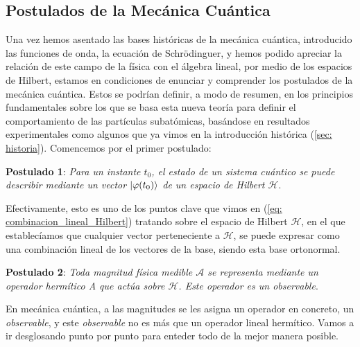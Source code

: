 \documentclass[12pt]{article}
\numberwithin{equation}{section} %
\begin{document}
    \vspace{5mm}

    \subsection{Postulados de la Mecánica Cuántica}\label{sec: postulados}

    \vspace{5mm}

    Una vez hemos asentado las bases históricas de la mecánica cuántica, introducido las funciones de onda, la ecuación de Schrödinguer, y hemos podido apreciar la relación de este campo de la física con el álgebra lineal, por medio de los espacios de Hilbert, estamos en condiciones de enunciar y comprender los postulados de la mecánica cuántica. Estos se podrían definir, a modo de resumen, en los principios fundamentales sobre los que se basa esta nueva teoría para definir el comportamiento de las partículas subatómicas, basándose en resultados experimentales como algunos que ya vimos en la introducción histórica (\ref{sec: historia}). Comencemos por el primer postulado:
    
    \vspace{7.5mm}

    \textbf{Postulado 1}: \textit{Para un instante \( t_{0} \), el estado de un sistema cuántico se puede describir mediante un vector \( \ket{\varphi(t_{0})} \) de un espacio de Hilbert \( \mathcal{H} \)}.

    \vspace{2.5mm}

    Efectivamente, esto es uno de los puntos clave que vimos en (\ref{eq: combinacion_lineal_Hilbert}) tratando sobre el espacio de Hilbert \( \mathcal{H}\), en el que establecíamos que cualquier vector perteneciente a \( \mathcal{H} \), se puede expresar como una combinación lineal de los vectores de la base, siendo esta base ortonormal.

    \vspace{10mm}

    \textbf{Postulado 2}: \textit{Toda magnitud física medible \( \mathcal{A} \) se representa mediante un operador
    hermítico A que actúa sobre \( \mathcal{H} \). Este operador es un observable}.
    
    \vspace{5mm}

    En mecánica cuántica, a las magnitudes se les asigna un operador en concreto, un \textit{observable}, y este \textit{observable} no es más que un operador lineal hermítico. Vamos a ir desglosando punto por punto para enteder todo de la mejor manera posible.
\end{document}
